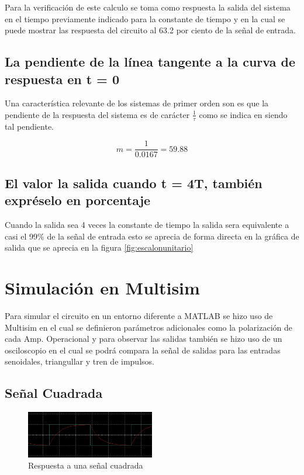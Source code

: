 \documentclass[conference]{IEEEtran}
\begin{document}
	Para la verificación de este calculo se toma como respuesta la salida del sistema en el tiempo previamente indicado para la constante de tiempo y en la  cual se puede mostrar las respuesta del circuito al 63.2 por ciento de la señal de entrada.
	
	\subsection{La pendiente de la línea tangente a la curva de respuesta en t = 0}
	Una característica relevante de los sistemas de primer orden son es que la pendiente de la respuesta del sistema es de carácter $\frac{1}{\tau}$ como se indica en siendo tal pendiente.
	
	\begin{equation}
		m = \frac{1}{0.0167} = 59.88
	\end{equation}
	
	\subsection{El valor la salida cuando t = 4T, también expréselo en porcentaje}
	
	Cuando la salida sea 4 veces la constante de tiempo la salida sera equivalente a casi el 99\%  de la señal de entrada esto se aprecia de forma directa en la gráfica de salida que se aprecia en la figura \ref{fig:escalonunitario}
	
	\section{Simulación en Multisim}
	Para simular el circuito en un entorno diferente a MATLAB se hizo uso de Multisim en el cual se definieron parámetros adicionales como la polarización de cada Amp. Operacional y para observar las salidas también se hizo uso de un osciloscopio en el cual se podrá compara la señal de salidas para las entradas senoidales, triangullar y tren de impulsos.
	
	\subsection{Señal Cuadrada}
	
	\begin{figure}[h]
		\centering
		\includegraphics[width=0.5\textwidth]{media/cuadrada}
		\caption{Respuesta a una señal cuadrada}
		\label{fig:cuadrada}
	\end{figure}
	
\end{document}
